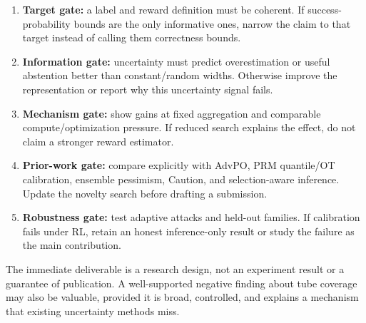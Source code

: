 \begin{enumerate}
\item \textbf{Target gate:} a label and reward definition must be coherent.
If success-probability bounds are the only informative ones, narrow the claim to
that target instead of calling them correctness bounds.
\item \textbf{Information gate:} uncertainty must predict overestimation or
useful abstention better than constant/random widths. Otherwise improve the
representation or report why this uncertainty signal fails.
\item \textbf{Mechanism gate:} show gains at fixed aggregation and comparable
compute/optimization pressure. If reduced search explains the effect, do not
claim a stronger reward estimator.
\item \textbf{Prior-work gate:} compare explicitly with AdvPO, PRM quantile/OT
calibration, ensemble pessimism, Caution, and selection-aware inference. Update
the novelty search before drafting a submission.
\item \textbf{Robustness gate:} test adaptive attacks and held-out families. If
calibration fails under RL, retain an honest inference-only result or study the
failure as the main contribution.
\end{enumerate}
The immediate deliverable is a research design, not an experiment result or a
guarantee of publication. A well-supported negative finding about tube coverage
may also be valuable, provided it is broad, controlled, and explains a mechanism
that existing uncertainty methods miss.
